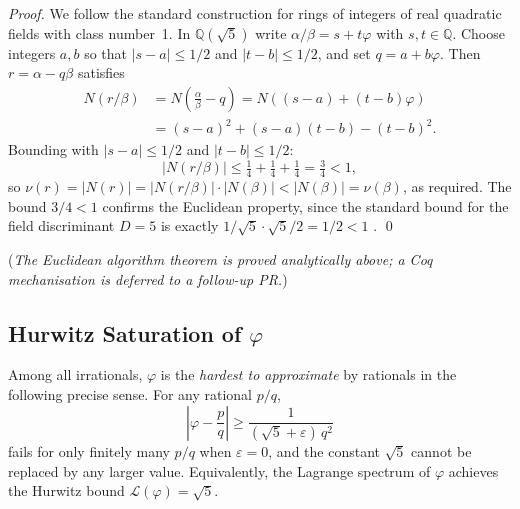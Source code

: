 \begin{proof}
We follow the standard construction for rings of integers of real
quadratic fields with class number~1.  In \(\mathbb{Q}(\sqrt{5})\)
write \(\alpha/\beta = s + t\varphi\) with \(s, t \in \mathbb{Q}\).
Choose integers \(a, b\) so that \(|s - a| \le 1/2\) and
\(|t - b| \le 1/2\), and set \(q = a + b\varphi\).  Then
\(r = \alpha - q\beta\) satisfies
\begin{align*}
  N(r/\beta)
  &= N\!\left(\frac{\alpha}{\beta} - q\right)
   = N\!\left((s-a) + (t-b)\varphi\right) \\
  &= (s-a)^2 + (s-a)(t-b) - (t-b)^2 .
\end{align*}
Bounding with \(|s-a| \le 1/2\) and \(|t-b| \le 1/2\):
\[
  |N(r/\beta)| \le \tfrac{1}{4} + \tfrac{1}{4} + \tfrac{1}{4} = \tfrac{3}{4} < 1 ,
\]
so \(\nu(r) = |N(r)| = |N(r/\beta)| \cdot |N(\beta)| < |N(\beta)| = \nu(\beta)\),
as required.  The bound \(3/4 < 1\) confirms the Euclidean property,
since the standard bound for the field discriminant \(D = 5\) is
exactly \(1/\sqrt{5} \cdot \sqrt{5}/2 = 1/2 < 1\) \cite{hardy_wright}.
\qed
\end{proof}

\noindent
{}%
\quad(\emph{The Euclidean algorithm theorem is proved analytically
above; a Coq mechanisation is deferred to a follow-up PR.})

\subsection{Hurwitz Saturation of \(\varphi\)}
\label{subsec:gs-hurwitz}

\begin{theorem}\label{thm:gs-hurwitz}
Among all irrationals, \(\varphi\) is the \emph{hardest to approximate}
by rationals in the following precise sense.  For any rational \(p/q\),
\[
  \left| \varphi - \frac{p}{q} \right| \ge \frac{1}{(\sqrt{5}+\varepsilon)\,q^2}
\]
fails for only finitely many \(p/q\) when \(\varepsilon = 0\), and
the constant \(\sqrt{5}\) cannot be replaced by any larger value.
Equivalently, the Lagrange spectrum of \(\varphi\) achieves the
Hurwitz bound \(\mathcal{L}(\varphi) = \sqrt{5}\).
\end{theorem}

